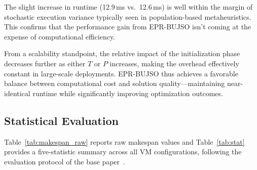 \documentclass[journal]{IEEEtran}
\begin{document}
The slight increase in runtime (12.9\,ms vs.\ 12.6\,ms) is well within the margin of stochastic execution variance typically seen in population-based metaheuristics. This confirms that the performance gain from EPR-BUJSO isn't coming at the expense of computational efficiency.

From a scalability standpoint, the relative impact of the initialization phase decreases further as either $T$ or $P$ increases, making the overhead effectively constant in large-scale deployments. EPR-BUJSO thus achieves a favorable balance between computational cost and solution quality---maintaining near-identical runtime while significantly improving optimization outcomes.

\subsection{Statistical Evaluation}

Table~\ref{tab:makespan_raw} reports raw makespan values and Table~\ref{tab:stat} provides a five-statistic summary across all VM configurations, following the evaluation protocol of the base paper~\cite{pachipala2024}.
\end{document}
